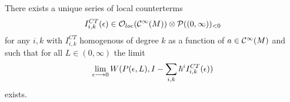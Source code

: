 \begin{theo}
  There exists a unique series of local counterterms
  $$ I_{i,k}^{CT}(\epsilon) \in \OO_{loc}(\Ci(M)) \otimes \mathcal{P}((0,\infty))_{<0} $$
  for any $i,k$ with $I_{i,k}^{CT}$ homogenous of degree $k$ as a function of $a \in \mathcal{C}^{\infty}(M)$ and such that for all $L \in (0,\infty)$ the limit
  $$ \lim_{\epsilon \lra 0} W(P(\epsilon, L), I - \sum_{i,k} \hbar^i I_{i,k}^{CT}(\epsilon)) $$
  exists.
\end{theo}






\newpage
